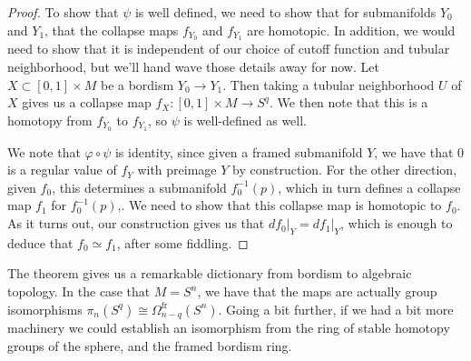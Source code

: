 \documentclass[psamsfonts]{amsart}
\theoremstyle{definition}
\theoremstyle{remark}
\newcommand{\inv}{^{-1}}
\begin{document}
\begin{proof}
To show that $\psi$ is well defined, we need to show that for submanifolds $Y_0$ and $Y_1$, that the collapse maps $f_{Y_0}$ and $f_{Y_1}$ are homotopic. In addition, we would need to show that it is independent of our choice of cutoff function and tubular neighborhood, but we'll hand wave those details away for now. Let $X \subset [0,1] \times M$ be a bordism $Y_0 \to Y_1$. Then taking a tubular neighborhood $U$ of $X$ gives us a collapse map $f_X : [0,1] \times M \to S^q$. We then note that this is a homotopy from $f_{Y_0}$ to $f_{Y_1}$, so $\psi$ is well-defined as well.

We note that $\varphi \circ \psi$ is identity, since given a framed submanifold $Y$, we have that $0$ is a regular value of $f_Y$ with preimage $Y$ by construction. For the other direction, given $f_0$, this determines a submanifold $f_0\inv(p)$, which in turn defines a collapse map $f_1$ for $f_0\inv(p)$,. We need to show that this collapse map is homotopic to $f_0$. As it turns out, our construction gives us that $df_0\vert_Y = df_1\vert_Y$, which is enough to deduce that $f_0 \simeq f_1$, after some fiddling.
\fi
\end{proof}
The theorem gives us a remarkable dictionary from bordism to algebraic topology. In the case that $M = S^n$, we have that the maps are actually group isomorphisms $\pi_n(S^q) \cong \Omega^{\text{fr}}_{n-q}(S^n)$. Going a bit further, if we had a bit more machinery we could establish an isomorphism from the ring of stable homotopy groups of the sphere, and the framed bordism ring.
%
\end{document}
